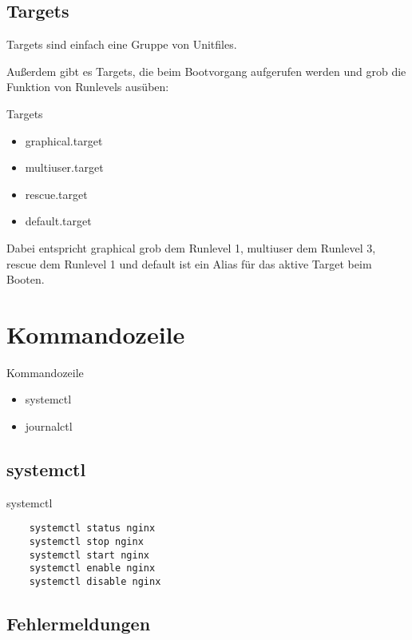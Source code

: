 \subsection{Targets}
Targets sind einfach eine Gruppe von Unitfiles.

Außerdem gibt es Targets, die beim Bootvorgang aufgerufen werden und grob
die Funktion von Runlevels ausüben:

\begin{frame}[fragile]{Targets}
  \begin{itemize}
  \item graphical.target
  \item multiuser.target
  \item rescue.target
  \item default.target
  \end{itemize}
\end{frame}

Dabei entspricht graphical grob dem Runlevel 1, multiuser dem Runlevel 3,
rescue dem Runlevel 1 und default ist ein Alias für das aktive Target
beim Booten.

\section{Kommandozeile}

\begin{frame}{Kommandozeile}
  \begin{itemize}
  \item systemctl
  \item journalctl
  \end{itemize}
\end{frame}

\subsection{systemctl}

\begin{frame}[fragile]{systemctl}
 \begin{lstlisting} 
    systemctl status nginx
    systemctl stop nginx
    systemctl start nginx
    systemctl enable nginx
    systemctl disable nginx
  \end{lstlisting}
\end{frame}

\subsection{Fehlermeldungen}

